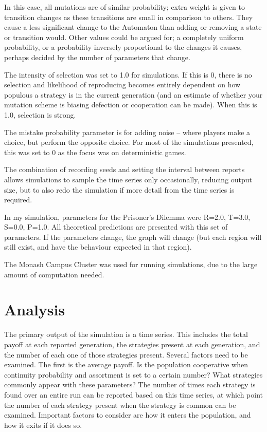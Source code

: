 \documentclass[a4paper,11pt,bcshonoursthesis,singlespace,oneside,thesisdraft,pdflatex]{cssethesis}
\begin{document}
In this case, all mutations are of similar probability; extra weight is given to transition changes as these transitions are small in comparison to others. 
They cause a less significant change to the Automaton than adding or removing a state or transition would.  
Other values could be argued for; a completely uniform probability, or a probability inversely proportional to the changes it causes, perhaps decided by the number of parameters that change. 

The intensity of selection was set to 1.0 for simulations. 
If this is 0, there is no selection and likelihood of reproducing becomes entirely dependent on how populous a strategy is in the current generation (and an estimate of whether your mutation scheme is biasing defection or cooperation can be made). When this is 1.0, selection is strong. 

The mistake probability parameter is for adding noise -- where players make a choice, but perform the opposite choice. For most of the simulations presented, this was set to $0$ as the focus was on deterministic games. 

The combination of recording seeds and setting the interval between reports allows simulations to sample the time series only occasionally, reducing output size, but to also redo the simulation if more detail from the time series is required. 

In my simulation, parameters for the Prisoner's Dilemma were R=2.0, T=3.0, S=0.0, P=1.0. 
All theoretical predictions are presented with this set of parameters. 
If the parameters change, the graph will change (but each region will still exist, and have the behaviour expected in that region). 

The Monash Campus Cluster \citep{cluster} was used for running simulations, due to the large amount of computation needed. 

\section{Analysis}
The primary output of the simulation is a time series. 
This includes the total payoff at each reported generation, the strategies present at each generation, and the number of each one of those strategies present. 
Several factors need to be examined. The first is the average payoff. Is the population cooperative when continuity probability and assortment is set to a certain number? 
What strategies commonly appear with these parameters? 
The number of times each strategy is found over an entire run can be reported based on this time series, at which point the number of each strategy present when the strategy is common can be examined. Important factors to consider are how it enters the population, and how it exits if it does so. 
\end{document}
